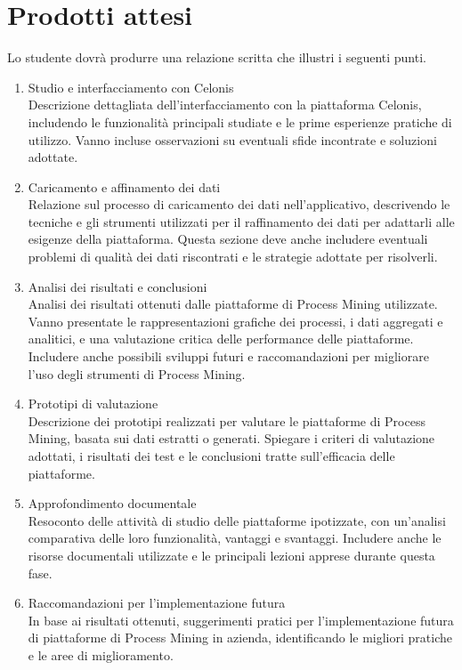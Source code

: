\section*{Prodotti attesi}
Lo studente dovrà produrre una relazione scritta che illustri i seguenti punti.
\begin{enumerate}
	\item Studio e interfacciamento con Celonis \\
Descrizione dettagliata dell'interfacciamento con la piattaforma Celonis, includendo le funzionalità principali studiate e le prime esperienze pratiche di utilizzo. Vanno incluse osservazioni su eventuali sfide incontrate e soluzioni adottate.

	\item Caricamento e affinamento dei dati \\
Relazione sul processo di caricamento dei dati nell'applicativo, descrivendo le tecniche e gli strumenti utilizzati per il raffinamento dei dati per adattarli alle esigenze della piattaforma. Questa sezione deve anche includere eventuali problemi di qualità dei dati riscontrati e le strategie adottate per risolverli.

	\item Analisi dei risultati e conclusioni \\
Analisi dei risultati ottenuti dalle piattaforme di Process Mining utilizzate. Vanno presentate le rappresentazioni grafiche dei processi, i dati aggregati e analitici, e una valutazione critica delle performance delle piattaforme. Includere anche possibili sviluppi futuri e raccomandazioni per migliorare l'uso degli strumenti di Process Mining.

	\item Prototipi di valutazione \\
Descrizione dei prototipi realizzati per valutare le piattaforme di Process Mining, basata sui dati estratti o generati. Spiegare i criteri di valutazione adottati, i risultati dei test e le conclusioni tratte sull'efficacia delle piattaforme.

	\item Approfondimento documentale \\
Resoconto delle attività di studio delle piattaforme ipotizzate, con un'analisi comparativa delle loro funzionalità, vantaggi e svantaggi. Includere anche le risorse documentali utilizzate e le principali lezioni apprese durante questa fase.

	\item Raccomandazioni per l'implementazione futura \\
In base ai risultati ottenuti, suggerimenti pratici per l'implementazione futura di piattaforme di Process Mining in azienda, identificando le migliori pratiche e le aree di miglioramento.

\end{enumerate}

